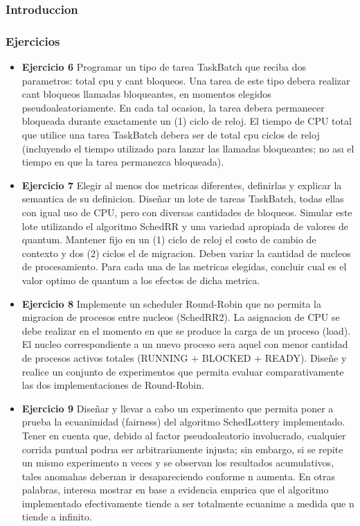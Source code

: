 
\subsubsection{Introduccion}

\subsubsection{Ejercicios}
\begin{itemize}
 
\item \textbf{Ejercicio 6}  Programar un tipo de tarea TaskBatch que reciba dos parametros: total cpu y
cant bloqueos. Una tarea de este tipo debera realizar cant bloqueos llamadas bloqueantes, en
momentos elegidos pseudoaleatoriamente. En cada tal ocasion, la tarea debera permanecer
bloqueada durante exactamente un (1) ciclo de reloj. El tiempo de CPU total que utilice una
tarea TaskBatch debera ser de total cpu ciclos de reloj (incluyendo el tiempo utilizado para
lanzar las llamadas bloqueantes; no ası el tiempo en que la tarea permanezca bloqueada).

\item \textbf{Ejercicio 7} Elegir al menos dos metricas diferentes, definirlas y explicar la semantica de
su definicion. Diseñar un lote de tareas TaskBatch, todas ellas con igual uso de CPU, pero
con diversas cantidades de bloqueos. Simular este lote utilizando el algoritmo SchedRR y una
variedad apropiada de valores de quantum. Mantener fijo en un (1) ciclo de reloj el costo de
cambio de contexto y dos (2) ciclos el de migracion. Deben variar la cantidad de nucleos de
procesamiento. Para cada una de las metricas elegidas, concluir cual es el valor optimo de
quantum a los efectos de dicha metrica.

\item \textbf{Ejercicio 8} Implemente un scheduler Round-Robin que no permita la migracion de procesos
entre nucleos (SchedRR2). La asignacion de CPU se debe realizar en el momento en que se produce la carga 
de un proceso (load). El nucleo correspondiente a un nuevo proceso sera aquel
con menor cantidad de procesos activos totales (RUNNING + BLOCKED + READY). Diseñe y realice un conjunto 
de experimentos que permita evaluar comparativamente las dos implementaciones de Round-Robin.

\item \textbf{Ejercicio 9} Diseñar y llevar a cabo un experimento que permita poner a prueba la ecuanimidad 
(fairness) del algoritmo SchedLottery implementado. Tener en cuenta que, debido
al factor pseudoaleatorio involucrado, cualquier corrida puntual podrıa ser arbitrariamente
injusta; sin embargo, si se repite un mismo experimento n veces y se observan los resultados acumulativos, 
tales anomalıas deberıan ir desapareciendo conforme n aumenta. En otras
palabras, interesa mostrar en base a evidencia empırica que el algoritmo implementado efectivamente tiende 
a ser totalmente ecuanime a medida que n tiende a infinito.


\end{itemize}
